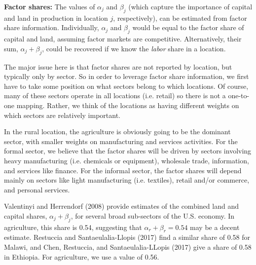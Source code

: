 \documentclass[10pt]{article}
\begin{document}
\textbf{Factor shares:} The values of $\alpha_j$ and $\beta_j$ (which capture the importance of capital and land in production in location $j$, respectively), can be estimated from factor share information. Individually, $\alpha_j$ and $\beta_j$ would be equal to the factor share of capital and land, assuming factor markets are competitive. Alternatively, their sum, $\alpha_j + \beta_j$, could be recovered if we know the \textit{labor} share in a location. 

The major issue here is that factor shares are not reported by location, but typically only by sector. So in order to leverage factor share information, we first have to take some position on what sectors belong to which locations. Of course, many of these sectors operate in all locations (i.e. retail) so there is not a one-to-one mapping. Rather, we think of the locations as having different weights on which sectors are relatively important. 

In the rural location, the agriculture is obviously going to be the dominant sector, with smaller weights on manufacturing and services activities. For the formal sector, we believe that the factor shares will be driven by sectors involving heavy manufacturing (i.e. chemicals or equipment), wholesale trade, information, and services like finance. For the informal sector, the factor shares will depend mainly on sectors like light manufacturing (i.e. textiles), retail and/or commerce, and personal services. 

Valentinyi and Herrendorf (2008) provide estimates of the combined land and capital shares, $\alpha_j + \beta_j$, for several broad sub-sectors of the U.S. economy. In agriculture, this share is 0.54, suggesting that $\alpha_r + \beta_r = 0.54$ may be a decent estimate. Restuccia and Santaeulalia-Llopis (2017) find a similar share of 0.58 for Malawi, and Chen, Restuccia, and Santaeulalia-LLopis (2017) give a share of 0.58 in Ethiopia. For agriculture, we use a value of 0.56. 
\end{document}
